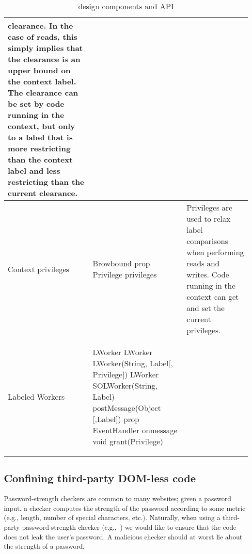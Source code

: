 \begin{table*}[t]
\begin{tabular}{l | m{2.35in} | m{3.5in}}
clearance.
%
In the case of reads, this simply implies that the clearance is an
upper bound on the context label.
%
The clearance can be set by code running in the context, but only to a
label that is more restricting than the context label and less
restricting than the current clearance.
\\\hline %
Context privileges  &  
\begin{webidl}
Browbound {
  prop Privilege privileges
}
\end{webidl}
&
Privileges are used to relax label comparisons when performing reads
and writes.
%
Code running in the context can get and set the current privileges.
\\\hline %
Labeled Workers  &  
\begin{webidl}
LWorker {
  LWorker LWorker(String, Label[, Privilege])
  LWorker SOLWorker(String, Label)
  postMessage(Object [,Label])
  prop EventHandler onmessage
  void grant(Privilege)
}
\end{webidl}
&
\\\hline %
\end{tabular}
\caption{\label{systemAPI} \sys{} design components and API}
\end{table*}


\subsection{Confining third-party DOM-less code}
\label{sec:system:worker}

Password-strength checkers are common to many websites;
%
given a password input, a checker computes the strength of the
password according to some metric (e.g., length, number of special
characters, etc.).
%
Naturally, when using a third-party password-strength checker
(e.g.,~) we would like to ensure that the
code does not leak the user's password.
%
A malicious checker should at worst lie about the strength of a
password.


